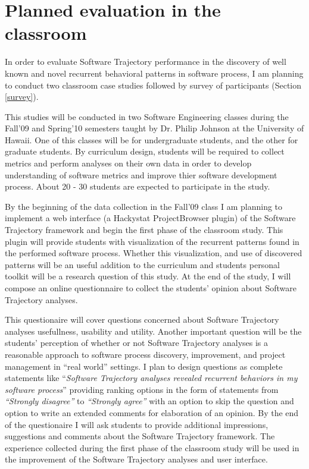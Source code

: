 \section{Planned evaluation in the classroom}\label{classroom}
In order to evaluate Software Trajectory performance in the discovery of well known and novel recurrent behavioral patterns in software process, I am planning to conduct two classroom case studies followed by survey of participants (Section \ref{survey}). 

This studies will be conducted in two Software Engineering classes during the Fall'09 and Spring'10 semesters taught by Dr. Philip Johnson at the University of Hawaii. One of this classes will be for undergraduate students, and the other for graduate students. By curriculum design, students will be required to collect metrics and perform analyses on their own data in order to develop understanding of software metrics and improve thier software development process. About 20 - 30 students are expected to participate in the study. 

By the beginning of the data collection in the Fall'09 class I am planning to implement a web interface (a Hackystat ProjectBrowser plugin) of the Software Trajectory framework and begin the first phase of the classroom study. This plugin will provide students with visualization of the recurrent patterns found in  the performed software process. Whether this visualization, and use of discovered patterns will be an useful addition to the curriculum and students personal toolkit will be a research question of this study. At the end of the study, I will compose an online questionnaire to collect the students' opinion about Software Trajectory analyses. 

This questionaire will cover questions concerned about Software Trajectory analyses usefullness, usability and utility. Another important question will be the students' perception of whether or not Software Trajectory analyses is a reasonable approach to software process discovery, improvement, and project management in ``real world'' settings. I plan to design questions as complete statements like ``\textit{Software Trajectory analyses revealed recurrent behaviors in my software process}'' providing ranking options in the form of statements from \textit{``Strongly disagree''} to \textit{``Strongly agree''} with an option to skip the question and option to write an extended comments for elaboration of an opinion. By the end of the questionaire I will ask students to provide additional impressions, suggestions and comments about the Software Trajectory framework. The experience collected during the first phase of the classroom study will be used in the improvement of the Software Trajectory analyses and user interface.

